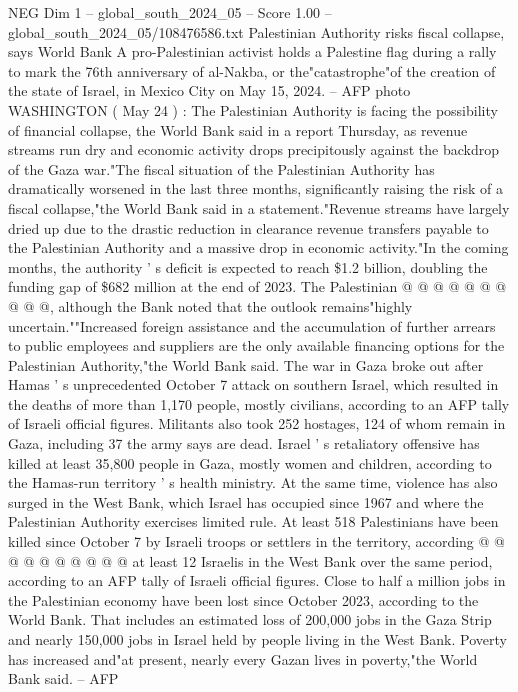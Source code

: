 \begin{textsample}{NEG Dim 1 – global\_south\_2024\_05 – Score 1.00 – global\_south\_2024\_05/108476586.txt}  \label{ex:f1_neg_215}
Palestinian Authority risks fiscal collapse, says World Bank A pro-Palestinian activist holds a Palestine flag during a rally to mark the 76th anniversary of al-Nakba, or the"catastrophe"of the creation of the state of Israel, in Mexico City on May 15, 2024. -- AFP photo WASHINGTON ( May 24 ) : The Palestinian Authority is facing the possibility of financial collapse, the World Bank said in a report Thursday, as revenue streams run dry and economic activity drops precipitously against the backdrop of the Gaza war."The fiscal situation of the Palestinian Authority has dramatically worsened in the last three months, significantly raising the risk of a fiscal collapse,"the World Bank said in a statement."Revenue streams have largely dried up due to the drastic reduction in clearance revenue transfers payable to the Palestinian Authority and a massive drop in economic activity."In the coming months, the authority ' s deficit is expected to reach \$1.2 billion, doubling the funding gap of \$682 million at the end of 2023.
The Palestinian @ @ @ @ @ @ @ @ @ @, although the Bank noted that the outlook remains"highly uncertain.""Increased foreign assistance and the accumulation of further arrears to public employees and suppliers are the only available financing options for the Palestinian Authority,"the World Bank said.
The war in Gaza broke out after Hamas ' s unprecedented October 7 attack on southern Israel, which resulted in the deaths of more than 1,170 people, mostly civilians, according to an AFP tally of Israeli official figures.
Militants also took 252 hostages, 124 of whom remain in Gaza, including 37 the army says are dead.
Israel ' s retaliatory offensive has killed at least 35,800 people in Gaza, mostly women and children, according to the Hamas-run territory ' s health ministry.
At the same time, violence has also surged in the West Bank, which Israel has occupied since 1967 and where the Palestinian Authority exercises limited rule.
At least 518 Palestinians have been killed since October 7 by Israeli troops or settlers in the territory, according @ @ @ @ @ @ @ @ @ @ at least 12 Israelis in the West Bank over the same period, according to an AFP tally of Israeli official figures.
Close to half a million jobs in the Palestinian economy have been lost since October 2023, according to the World Bank.
That includes an estimated loss of 200,000 jobs in the Gaza Strip and nearly 150,000 jobs in Israel held by people living in the West Bank.
Poverty has increased and"at present, nearly every Gazan lives in poverty,"the World Bank said. -- AFP

\end{textsample}
